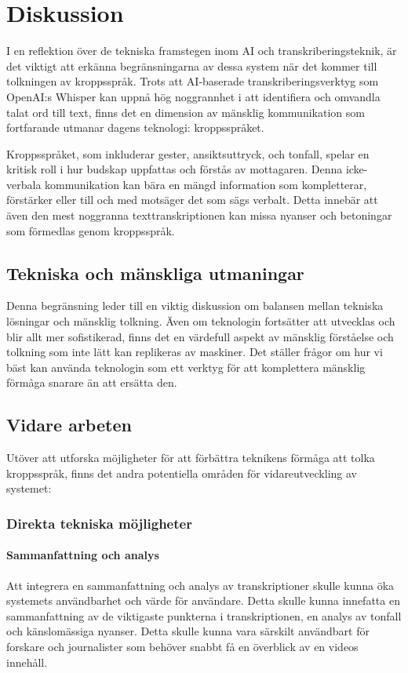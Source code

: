 \chapter{Diskussion}
I en reflektion över de tekniska framstegen inom AI och transkriberingsteknik, är
det viktigt att erkänna begränsningarna av dessa system när det kommer till
tolkningen av kroppsspråk. Trots att AI-baserade transkriberingsverktyg som
OpenAI:s Whisper kan uppnå hög noggrannhet i att identifiera och omvandla
talat ord till text, finns det en dimension av mänsklig kommunikation som
fortfarande utmanar dagens teknologi: kroppsspråket.

Kroppsspråket, som inkluderar gester, ansiktsuttryck, och tonfall, spelar en
kritisk roll i hur budskap uppfattas och förstås av mottagaren. Denna
icke-verbala kommunikation kan bära en mängd information som kompletterar,
förstärker eller till och med motsäger det som sägs verbalt. Detta innebär att
även den mest noggranna texttranskriptionen kan missa nyanser och betoningar
som förmedlas genom kroppsspråk.

\section{Tekniska och mänskliga utmaningar}
Denna begränsning leder till en viktig diskussion om balansen mellan tekniska
lösningar och mänsklig tolkning. Även om teknologin fortsätter att utvecklas
och blir allt mer sofistikerad, finns det en värdefull aspekt av mänsklig
förståelse och tolkning som inte lätt kan replikeras av maskiner. Det ställer
frågor om hur vi bäst kan använda teknologin som ett verktyg för att
komplettera mänsklig förmåga snarare än att ersätta den.

\section{Vidare arbeten}
Utöver att utforska möjligheter för att förbättra teknikens förmåga att tolka
kroppsspråk, finns det andra potentiella områden för vidareutveckling av
systemet:

\subsection{Direkta tekniska möjligheter}

\subsubsection{Sammanfattning och analys}
Att integrera en sammanfattning och analys av transkriptioner skulle kunna
öka systemets användbarhet och värde för användare. Detta skulle kunna
innefatta en sammanfattning av de viktigaste punkterna i transkriptionen, en
analys av tonfall och känslomässiga nyanser. Detta skulle kunna vara särskilt
användbart för forskare och journalister som behöver snabbt få en överblick av
en videos innehåll.

